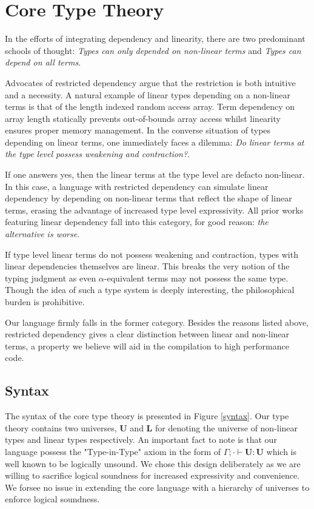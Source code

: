 \documentclass{article}
\newcommand{\U}{\textbf{U}}
\renewcommand{\L}{\textbf{L}}
\begin{document}
  \section{Core Type Theory}
  In the efforts of integrating dependency and linearity, there are two predominant schools of thought: \textit{Types can only depended on non-linear terms} and \textit{Types can depend on all terms}. 
  
  Advocates of restricted dependency argue that the restriction is both intuitive and a necessity. A natural example of linear types depending on a non-linear terms is that of the length indexed random access array. Term dependency on array length statically prevents out-of-bounds array access whilst linearity ensures proper memory management. In the converse situation of types depending on linear terms, one immediately faces a dilemma: \textit{Do linear terms at the type level possess weakening and contraction?}.
  
  If one answers yes, then the linear terms at the type level are defacto non-linear. In this case, a language with restricted dependency can simulate linear dependency by depending on non-linear terms that reflect the shape of linear terms, erasing the advantage of increased type level expressivity. All prior works featuring linear dependency fall into this category, for good reason: \textit{the alternative is worse}.
  
  If type level linear terms do not possess weakening and contraction, types with linear dependencies themselves are linear. This breaks the very notion of the typing judgment as even $\alpha$-equivalent terms may not possess the same type. Though the idea of such a type system is deeply interesting, the philosophical burden is prohibitive.
  
  Our language firmly falls in the former category. Besides the reasons listed above, restricted dependency gives a clear distinction between linear and non-linear terms, a property we believe will aid in the compilation to high performance code.
  
  \subsection{Syntax}
  The syntax of the core type theory is presented in Figure \ref{syntax}. Our type theory contains two universes, $\U$ and $\L$ for denoting the universe of non-linear types and linear types respectively. An important fact to note is that our language possess the "Type-in-Type" axiom in the form of $\Gamma ; \cdot \vdash \U : \U$ which is well known to be logically unsound. We chose this design deliberately as we are willing to sacrifice logical soundness for increased expressivity and convenience. We forsee no issue in extending the core language with a hierarchy of universes to enforce logical soundness.
\end{document}
